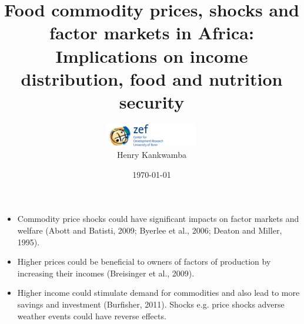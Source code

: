 \documentclass{beamer}
\title{Food commodity prices, shocks and factor markets in Africa: Implications on income distribution, food and nutrition security}
\date{\today}
\author{\includegraphics[height=1cm,width=5cm]{logo_zef.png} \\ Henry Kankwamba}
\begin{document}

  \maketitle
  \begin{frame}
\begin{itemize}
	\item     <1-| alert@1> Commodity price shocks could have significant impacts on factor markets and welfare (Abott and Batisti, 2009; Byerlee et al., 2006; Deaton and Miller, 1995). 
	\item <2-| alert@2> Higher prices could be beneficial to owners of factors of production by increasing their incomes (Breisinger et al., 2009). 
	\item <3-| alert@3> Higher income could stimulate demand for commodities and also lead to more savings and investment (Burfisher, 2011). Shocks e.g. price shocks adverse weather events could have reverse effects.
	\end{itemize}
  \end{frame}
  
\end{document}
